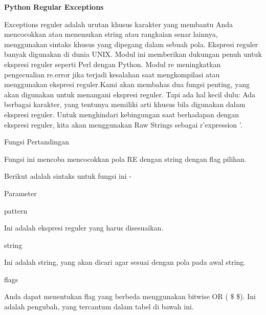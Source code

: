 \sloppy
\begin{center}{\fontsize{16pt}{16pt}\selectfont \textbf{Python Regular Exceptions} \\}\end{center} \par
Exceptions reguler adalah urutan khusus karakter yang membantu Anda mencocokkan atau menemukan string atau rangkaian senar lainnya, menggunakan sintaks khusus yang dipegang dalam sebuah pola. Ekspresi reguler banyak digunakan di dunia UNIX. Modul ini memberikan dukungan penuh untuk ekspresi reguler seperti Perl dengan Python. Modul re meningkatkan pengecualian re.error jika terjadi kesalahan saat mengkompilasi atau menggunakan ekspresi reguler.Kami akan membahas dua fungsi penting, yang akan digunakan untuk menangani ekspresi reguler. Tapi ada hal kecil dulu: Ada berbagai karakter, yang tentunya memiliki arti khusus bila digunakan dalam ekspresi reguler. Untuk menghindari kebingungan saat berhadapan dengan ekspresi reguler, kita akan menggunakan Raw Strings sebagai r'expression '. \par
\vspace{14pt}
\noindent 
Fungsi Pertandingan \par
\noindent 
Fungsi ini mencoba mencocokkan pola RE dengan string dengan flag pilihan. \par
\vspace{12pt}
\noindent 
Berikut adalah sintaks untuk fungsi ini - \par
\noindent 
  \par
\noindent 
Parameter \hspace*{0.5in}  \par
\noindent 
pattern \hspace*{0.5in}  \par
\noindent 
Ini adalah ekspresi reguler yang harus disesuaikan. \par
\vspace{12pt}
\noindent 
string \hspace*{0.5in}  \par
\noindent 
Ini adalah string, yang akan dicari agar sesuai dengan pola pada awal string. \par
\vspace{12pt}
\noindent 
flags \hspace*{0.5in}  \par
\noindent 
Anda dapat menentukan flag yang berbeda menggunakan bitwise OR ( \$  \vert  \$). Ini adalah pengubah, yang tercantum dalam tabel di bawah ini. \par
